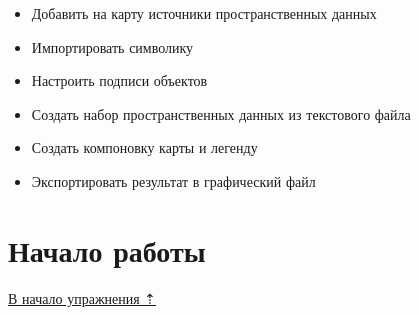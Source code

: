 \documentclass[
  12pt,
]{book}
\providecommand{\tightlist}{%
  \setlength{\itemsep}{0pt}\setlength{\parskip}{0pt}}
\begin{document}
\begin{itemize}
\tightlist
\item
  Добавить на карту источники пространственных данных
\item
  Импортировать символику
\item
  Настроить подписи объектов
\item
  Создать набор пространственных данных из текстового файла
\item
  Создать компоновку карты и легенду
\item
  Экспортировать результат в графический файл
\end{itemize}

\hypertarget{map-design-quaternary-begin}{%
\section{Начало работы}\label{map-design-quaternary-begin}}

\protect\hyperlink{map-design-quaternary}{В начало упражнения ⇡}
\end{document}
